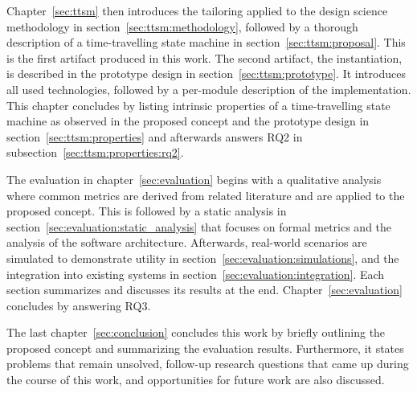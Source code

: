 Chapter~\ref{sec:ttsm} then introduces the tailoring applied to the design science methodology in section~\ref{sec:ttsm:methodology}, followed by a thorough description of a time-travelling state machine in section~\ref{sec:ttsm:proposal}. This is the first artifact produced in this work. The second artifact, the instantiation, is described in the prototype design in section~\ref{sec:ttsm:prototype}. It introduces all used technologies, followed by a per-module description of the implementation. This chapter concludes by listing intrinsic properties of a time-travelling state machine as observed in the proposed concept and the prototype design in section~\ref{sec:ttsm:properties} and afterwards answers RQ2 in subsection~\ref{sec:ttsm:properties:rq2}.

The evaluation in chapter~\ref{sec:evaluation} begins with a qualitative analysis where common metrics are derived from related literature and are applied to the proposed concept. This is followed by a static analysis in section~\ref{sec:evaluation:static_analysis} that focuses on formal metrics and the analysis of the software architecture. Afterwards, real-world scenarios are simulated to demonstrate utility in section~\ref{sec:evaluation:simulations}, and the integration into existing systems in section~\ref{sec:evaluation:integration}. Each section summarizes and discusses its results at the end. Chapter~\ref{sec:evaluation} concludes by answering RQ3.

The last chapter~\ref{sec:conclusion} concludes this work by briefly outlining the proposed concept and summarizing the evaluation results. Furthermore, it states problems that remain unsolved, follow-up research questions that came up during the course of this work, and opportunities for future work are also discussed.
